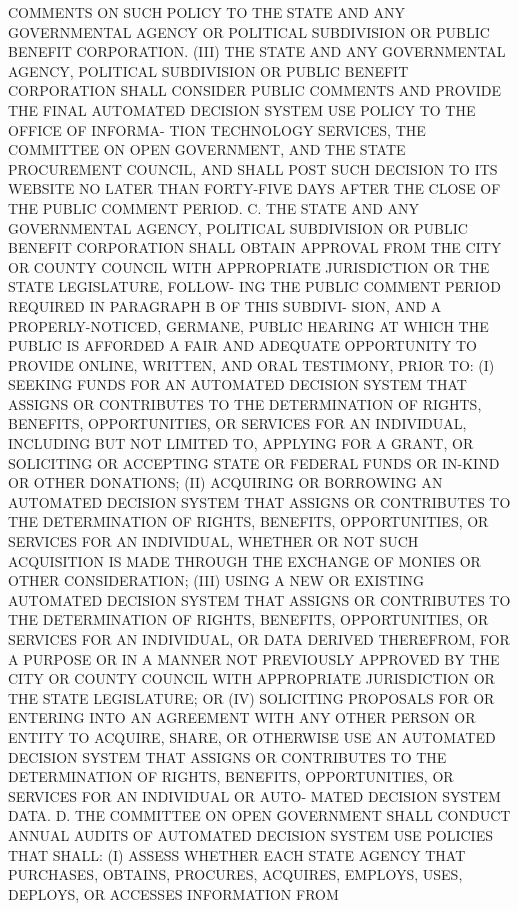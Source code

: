  COMMENTS  ON  SUCH  POLICY  TO  THE STATE AND ANY GOVERNMENTAL AGENCY OR
 POLITICAL SUBDIVISION OR PUBLIC BENEFIT CORPORATION.
   (III)  THE STATE AND ANY GOVERNMENTAL AGENCY, POLITICAL SUBDIVISION OR
 PUBLIC BENEFIT CORPORATION SHALL CONSIDER PUBLIC  COMMENTS  AND  PROVIDE
 THE FINAL AUTOMATED DECISION SYSTEM USE POLICY TO THE OFFICE OF INFORMA-
 TION  TECHNOLOGY  SERVICES,  THE  COMMITTEE  ON OPEN GOVERNMENT, AND THE
 STATE PROCUREMENT COUNCIL, AND SHALL POST SUCH DECISION TO  ITS  WEBSITE
 NO  LATER  THAN  FORTY-FIVE  DAYS  AFTER THE CLOSE OF THE PUBLIC COMMENT
 PERIOD.
   C. THE STATE AND ANY GOVERNMENTAL  AGENCY,  POLITICAL  SUBDIVISION  OR
 PUBLIC BENEFIT CORPORATION SHALL OBTAIN APPROVAL FROM THE CITY OR COUNTY
 COUNCIL  WITH APPROPRIATE JURISDICTION OR THE STATE LEGISLATURE, FOLLOW-
 ING THE PUBLIC COMMENT PERIOD REQUIRED IN PARAGRAPH B OF  THIS  SUBDIVI-
 SION,  AND  A  PROPERLY-NOTICED,  GERMANE,  PUBLIC  HEARING AT WHICH THE
 PUBLIC IS AFFORDED A FAIR AND ADEQUATE OPPORTUNITY  TO  PROVIDE  ONLINE,
 WRITTEN, AND ORAL TESTIMONY, PRIOR TO:
   (I)  SEEKING  FUNDS  FOR  AN AUTOMATED DECISION SYSTEM THAT ASSIGNS OR
 CONTRIBUTES TO THE DETERMINATION OF RIGHTS, BENEFITS, OPPORTUNITIES,  OR
 SERVICES FOR AN INDIVIDUAL, INCLUDING BUT NOT LIMITED TO, APPLYING FOR A
 GRANT,  OR  SOLICITING OR ACCEPTING STATE OR FEDERAL FUNDS OR IN-KIND OR
 OTHER DONATIONS;
   (II) ACQUIRING OR BORROWING AN AUTOMATED DECISION SYSTEM THAT  ASSIGNS
 OR  CONTRIBUTES TO THE DETERMINATION OF RIGHTS, BENEFITS, OPPORTUNITIES,
 OR SERVICES FOR AN INDIVIDUAL, WHETHER OR NOT SUCH ACQUISITION  IS  MADE
 THROUGH THE EXCHANGE OF MONIES OR OTHER CONSIDERATION;
   (III)  USING  A NEW OR EXISTING AUTOMATED DECISION SYSTEM THAT ASSIGNS
 OR CONTRIBUTES TO THE DETERMINATION OF RIGHTS, BENEFITS,  OPPORTUNITIES,
 OR  SERVICES FOR AN INDIVIDUAL, OR DATA DERIVED THEREFROM, FOR A PURPOSE
 OR IN A MANNER NOT PREVIOUSLY APPROVED BY THE  CITY  OR  COUNTY  COUNCIL
 WITH APPROPRIATE JURISDICTION OR THE STATE LEGISLATURE; OR
   (IV)  SOLICITING  PROPOSALS FOR OR ENTERING INTO AN AGREEMENT WITH ANY
 OTHER PERSON OR ENTITY TO ACQUIRE, SHARE, OR OTHERWISE USE AN  AUTOMATED
 DECISION  SYSTEM  THAT  ASSIGNS  OR  CONTRIBUTES TO THE DETERMINATION OF
 RIGHTS, BENEFITS, OPPORTUNITIES, OR SERVICES FOR AN INDIVIDUAL OR  AUTO-
 MATED DECISION SYSTEM DATA.
   D.  THE  COMMITTEE  ON  OPEN GOVERNMENT SHALL CONDUCT ANNUAL AUDITS OF
 AUTOMATED DECISION SYSTEM USE POLICIES THAT SHALL:
   (I)  ASSESS  WHETHER  EACH  STATE  AGENCY  THAT  PURCHASES,   OBTAINS,
 PROCURES, ACQUIRES, EMPLOYS, USES, DEPLOYS, OR ACCESSES INFORMATION FROM
